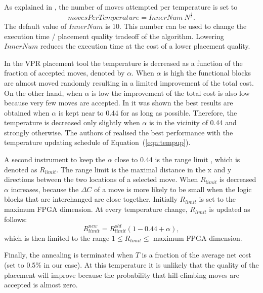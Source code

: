 \documentclass[a4paper,oneside,12pt]{article}
\begin{document}
As explained in \cite{swartz1990naftparomc}, the number of moves attempted per temperature is set to
\begin{equation}
movesPerTemperature = InnerNum \  N^\frac{4}{3}.
\end{equation}
The default value of $InnerNum$ is 10. This number can be used to change the execution time / placement quality tradeoff of the algorithm. Lowering $InnerNum$ reduces the execution time at the cost of a lower placement quality.

In the VPR placement tool the temperature is decreased as a function of the fraction of accepted moves, denoted by $\alpha$. When $\alpha$ is high the functional blocks are almost moved randomly resulting in a limited improvement of the total cost. On the other hand, when $\alpha$ is low the improvement of the total cost is also low because very few moves are accepted. In \cite{lam1988poanas,swartz1990naftparomc} it was shown the best results are obtained when $\alpha$ is kept near to 0.44 for as long as possible. Therefore, the temperature is decreased only slightly when $\alpha$ is in the vicinity of 0.44 and strongly otherwise. The authors of \cite{betz1999aacfdf} realised the best performance with the temperature updating schedule of Equation~(\ref{eqn:tempup}).


A second instrument to keep the $\alpha$ close to 0.44 is the range limit \cite{lam1988poanas}, which is denoted as $R_{limit}$. The range limit is the maximal distance in the x and y directions between the two locations of a selected move. When $R_{limit}$ is decreased $\alpha$ increases, because the $\Delta C$ of a move is more likely to be small when the logic blocks that are interchanged are close together. Initially $R_{limit}$ is set to the maximum FPGA dimension. At every temperature change, $R_{limit}$ is updated as follows:
\begin{equation}
R_{limit}^{new} = R_{limit}^{old} (1-0.44+\alpha),
\end{equation}
which is then limited to the range $1 \le R_{limit} \le$ maximum FPGA dimension. 

Finally, the annealing is terminated when $T$ is a fraction of the average net cost (set to 0.5\% in our case). At this temperature it is unlikely that the quality of the placement will improve because the probability that hill-climbing moves are accepted is almost zero.
\end{document}
